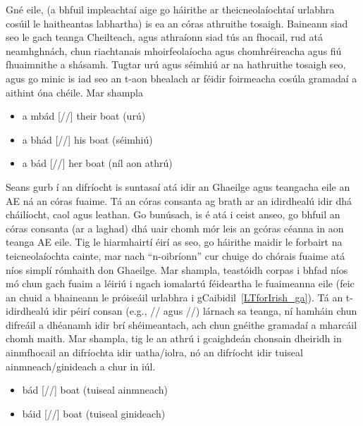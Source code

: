 \begin{multicols}{2}
Gné eile, (a bhfuil impleachtaí aige go háirithe ar theicneolaíochtaí urlabhra cosúil le haitheantas labhartha) is ea an córas athruithe tosaigh. Baineann siad seo le gach teanga Cheilteach, agus athraíonn siad tús an fhocail, rud atá neamhghnách, chun riachtanais mhoirfeolaíocha agus chomhréireacha agus fiú fhuaimnithe a shásamh. Tugtar urú agus séimhiú ar na hathruithe tosaigh seo, agus go minic is iad seo an t-aon bhealach ar féidir foirmeacha cosúla gramadaí a aithint óna chéile. Mar shampla

\begin{itemize}
\item a mbád [//] their boat (urú)
\item a bhád [//] his boat (séimhiú)
\item a bád [//] her boat (níl aon athrú)
\end{itemize}

Seans gurb í an difríocht is suntasaí atá idir an Ghaeilge agus teangacha eile an AE ná an córas fuaime. Tá an córas consanta ag brath ar an idirdhealú idir dhá cháilíocht, caol agus leathan. Go bunúsach, is é atá i ceist anseo, go bhfuil an córas consanta (ar a laghad) dhá uair chomh mór leis an gcóras céanna in aon teanga AE eile.  Tig le hiarmhairtí éirí as seo, go háirithe maidir le forbairt na teicneolaíochta cainte, mar nach “n-oibríonn” cur chuige do chórais fuaime atá níos simplí rómhaith don Ghaeilge. Mar shampla, teastóidh corpas i bhfad níos mó chun gach fuaim a léiriú i ngach iomalartú féideartha le fuaimeanna eile (feic an chuid a bhaineann le próiseáil urlabhra i gCaibidil~\ref{LTforIrish_ga}). Tá an t-idirdhealú idir péirí consan (e.g., // agus //) lárnach sa teanga, ní hamháin chun difreáil a dhéanamh idir brí shéimeantach, ach chun gnéithe gramadaí a mharcáil chomh maith. Mar shampla, tig le an athrú i gcaighdeán chonsain dheiridh in ainmfhocail an difríochta idir uatha/iolra, nó an difríocht idir tuiseal ainmneach/ginideach a chur in iúl.


\begin{itemize}
\item bád    [//]  boat  (tuiseal ainmneach)
\item báid   [//]  boat  (tuiseal ginideach)
\end{itemize}


\end{multicols}
